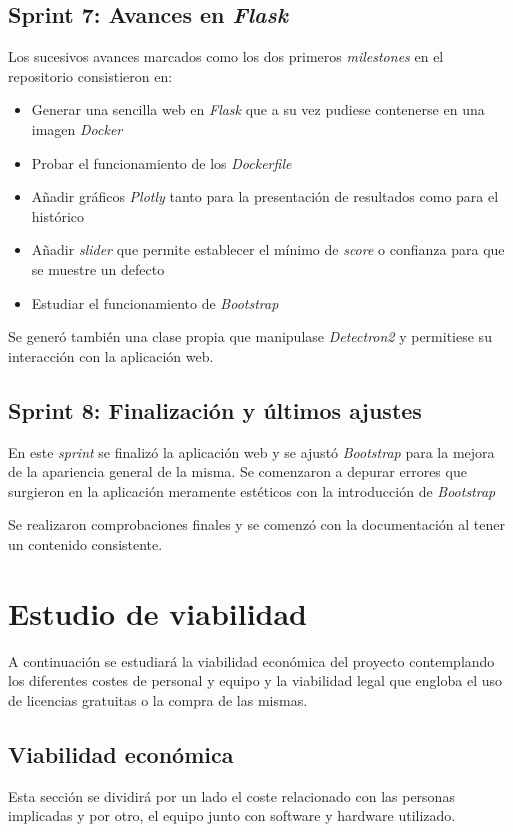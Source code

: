 \subsection{Sprint 7: Avances en \emph{Flask}}
Los sucesivos avances marcados como los dos primeros \emph{milestones} en el repositorio consistieron en:

\begin{itemize}
    \item Generar una sencilla web en \emph{Flask} que a su vez pudiese contenerse en una imagen \emph{Docker}
    \item Probar el funcionamiento de los \emph{Dockerfile}
    \item Añadir gráficos \emph{Plotly} tanto para la presentación de resultados como para el histórico
    \item Añadir \emph{slider} que permite establecer el mínimo de \emph{score} o confianza para que se muestre un defecto
    \item Estudiar el funcionamiento de \emph{Bootstrap}
\end{itemize}

Se generó también una clase propia que manipulase \emph{Detectron2} y permitiese su interacción con la aplicación web.

\subsection{Sprint 8: Finalización y últimos ajustes}
En este \emph{sprint} se finalizó la aplicación web y se ajustó \emph{Bootstrap} para la mejora de la apariencia general de la misma.
Se comenzaron a depurar errores que surgieron en la aplicación meramente estéticos con la introducción de \emph{Bootstrap}

Se realizaron comprobaciones finales y se comenzó con la documentación al tener un contenido consistente.

\clearpage

\section{Estudio de viabilidad}
A continuación se estudiará la viabilidad económica del proyecto contemplando los diferentes costes de personal y equipo y la viabilidad legal que engloba el uso de licencias gratuitas o la compra de las mismas.

\subsection{Viabilidad económica}
Esta sección se dividirá por un lado el coste relacionado con las personas implicadas y por otro, el equipo junto con software y hardware utilizado.

